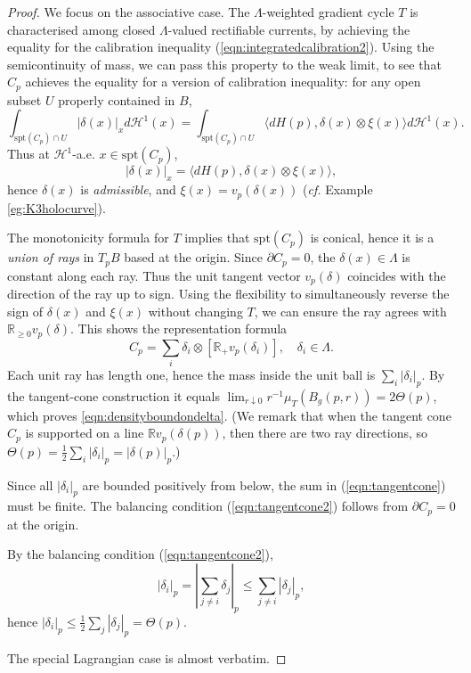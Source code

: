 \documentclass{article}
\theoremstyle{definition}
\newcommand{\cf}{\emph{cf.} }
\newcommand{\R}{\mathbb{R}}
\begin{document}
		
		\begin{proof}
			We focus on the associative case. The $\Lambda$-weighted gradient cycle $T$ is characterised among closed $\Lambda$-valued rectifiable currents, by achieving the equality for the calibration inequality (\ref{eqn:integratedcalibration2}). Using the semicontinuity of mass, we can pass this property to the weak limit, to see that $C_p$ achieves the equality for a version of calibration inequality: for any open subset $U$ properly contained in $B$,
			\[
			\int_{ \text{spt}(C_p) \cap U}  |\delta(x)|_x d\mathcal{H}^1(x)= \int_{  \text{spt}(C_p) \cap U }  \langle dH(p), \delta(x)\otimes \xi(x)\rangle d\mathcal{H}^1(x).
			\]
Thus at $\mathcal{H}^1$-a.e. $x\in \text{spt}(C_p)$, 
			\[
			|\delta(x)|_x = \langle dH(p), \delta(x)\otimes \xi(x)\rangle ,
			\]
			hence $\delta(x)$ is \emph{admissible}, and $\xi(x)= v_p(\delta(x))$ (\cf Example \ref{eg:K3holocurve}). 
			
			
			
			The monotonicity formula for $T$ implies that $\text{spt}(C_p)$ is conical, hence it is a \emph{union of rays} in $T_p B$ based at the origin. Since $\partial C_p=0$, the $\delta(x)\in \Lambda$ is constant along each ray. Thus the unit tangent vector  $v_p(\delta)$ coincides with the direction of the ray up to sign. 
		Using the flexibility to simultaneously reverse the sign of $\delta(x)$ and $\xi(x)$ without changing $T$, we can ensure the ray agrees with $\R_{\geq 0} v_p(\delta)$.
			This shows the representation formula 
			\[
				C_p= \sum_i  \delta_i\otimes   [\R_+ v_p(\delta_i)] ,\quad \delta_i\in \Lambda.
			\]
			Each unit ray has length one, hence the mass inside the unit ball is $\sum_i|\delta_i|_p$. By the tangent-cone construction it equals
				$\lim_{r\downarrow0}r^{-1}\mu_T(B_g(p,r))=2\Theta(p)$, which proves \eqref{eqn:densityboundondelta}.
			(We remark that when the tangent cone $C_p$ is supported on a line $\R v_p(\delta(p))$, then there are two ray directions, so $\Theta(p)= \frac{1}{2}\sum_i |\delta_i|_p= |\delta(p)|_p$.)
			
			
			
			
			 Since  all $|\delta_i|_p$ are bounded positively from below, the sum in (\ref{eqn:tangentcone}) must be finite. The balancing condition (\ref{eqn:tangentcone2}) follows from 
			 $\partial C_p=0$ at the origin.
			 
			 
			 
	By the balancing condition (\ref{eqn:tangentcone2}),
			 \[
			 |\delta_i|_p =|\sum_{j\neq i} \delta_j |_p \leq \sum_{j\neq i} |\delta_j|_p,
			 \]
			hence $|\delta_i|_p\leq \frac{1}{2} \sum_j |\delta_j|_p  = \Theta(p)$.
			 
			
			The special Lagrangian case is almost verbatim.
		\end{proof}
\end{document}
